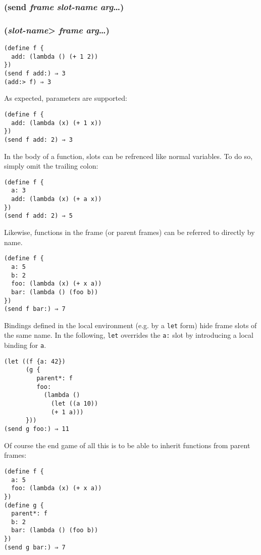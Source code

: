 \documentclass{article}
\begin{document}
\subsubsection{(send \emph{frame} \emph{slot-name} \emph{arg}\ldots{})}

\subsubsection{(\emph{slot-name}\textgreater{} \emph{frame}  \emph{arg}\ldots{})}

\begin{verbatim}
(define f {
  add: (lambda () (+ 1 2))
})
(send f add:) ⇒ 3
(add:> f) ⇒ 3
\end{verbatim}

As expected, parameters are supported:

\begin{verbatim}
(define f {
  add: (lambda (x) (+ 1 x))
})
(send f add: 2) ⇒ 3
\end{verbatim}

In the body of a function, slots can be refrenced like normal variables. To do so, simply omit
the trailing colon:

\begin{verbatim}
(define f {
  a: 3
  add: (lambda (x) (+ a x))
})
(send f add: 2) ⇒ 5
\end{verbatim}

Likewise, functions in the frame (or parent frames) can be referred to directly by name.

\begin{verbatim}
(define f {
  a: 5
  b: 2
  foo: (lambda (x) (+ x a))
  bar: (lambda () (foo b))
})
(send f bar:) ⇒ 7
\end{verbatim}

Bindings defined in the local environment (e.g. by a \verb|let| form) hide frame slots of
the same name. In the following, \verb|let| overrides the \verb|a:| slot by introducing a
local binding for \verb|a|.

\begin{verbatim}
(let ((f {a: 42})
      (g {
         parent*: f  
         foo: 
           (lambda ()
             (let ((a 10))
             (+ 1 a)))
      }))
(send g foo:) ⇒ 11
\end{verbatim}

Of course the end game of all this is to be able to inherit functions from parent frames:

\begin{verbatim}
(define f {
  a: 5
  foo: (lambda (x) (+ x a))
})
(define g {
  parent*: f
  b: 2
  bar: (lambda () (foo b))
})
(send g bar:) ⇒ 7
\end{verbatim}
\end{document}
